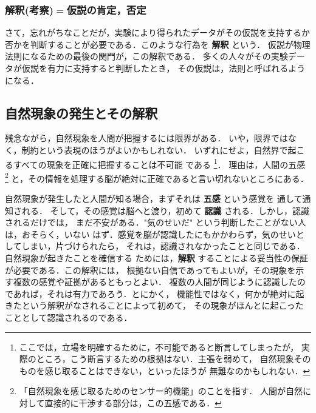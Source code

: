         \subsubsection{解釈(考察)$=$仮説の肯定，否定}
            さて，忘れがちなことだが，実験により得られたデータがその仮説を支持するか
            否かを判断することが必要である．このような行為を \textbf{解釈} という．
            仮説が物理法則になるための最後の関門が，この解釈である．
            多くの人々がその実験データが仮説を有力に支持すると判断したとき，
            その仮説は，法則と呼ばれるようになる．

            \subsection{自然現象の発生とその解釈}
            残念ながら，自然現象を人間が把握するには限界がある．
            いや，限界ではなく，制約という表現のほうがよいかもしれない．
            いずれにせよ，自然界で起こるすべての現象を正確に把握することは不可能
            である
                \footnote{
                    ここでは，立場を明確するために，不可能であると断言してしまったが，
                    実際のところ，こう断言するための根拠はない．主張を弱めて，
                    自然現象そのものを感じ取ることはできない，といったほうが
                    無難なのかもしれない．
                }．
            理由は，人間の五感
                \footnote{
                    「自然現象を感じ取るためのセンサー的機能」のことを指す．
                    人間が自然に対して直接的に干渉する部分は，この五感である．
                }
            と，その情報を処理する脳が絶対に正確であると言い切れないところにある．

            自然現象が発生したと人間が知る場合，まずそれは \textbf{五感} という感覚を
            通して通知される．
            そして，その感覚は脳へと渡り，初めて \textbf{認識} される．しかし，認識されるだけでは，
            まだ不安がある．"気のせいだ" という判断したことがない人は，おそらく，いない
            はず．感覚を脳が認識したにもかかわらず，気のせいとしてしまい，片づけられたら，
            それは，認識されなかったことと同じである．自然現象が起きたことを確信する
            ためには，\textbf{解釈} することによる妥当性の保証が必要である．この解釈には，
            根拠ない自信であってもよいが，その現象を示す複数の感覚や証拠があるともっとよい．
            複数の人間が同じように認識したのであれば，それは有力であろう．とにかく，
            機能性ではなく，何かが絶対に起きたという解釈がなされることによって初めて，
            その現象がほんとに起こったこととして認識されるのである．

